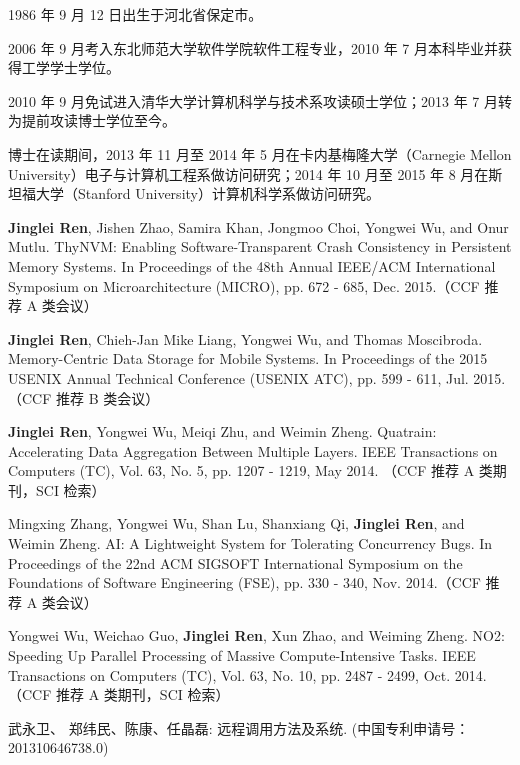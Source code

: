 \begin{resume}


  1986 年 9 月 12 日出生于河北省保定市。

  2006 年 9 月考入东北师范大学软件学院软件工程专业，2010 年 7 月本科毕业并获得工学学士学位。

  2010 年 9 月免试进入清华大学计算机科学与技术系攻读硕士学位；2013 年 7 月转为提前攻读博士学位至今。

  博士在读期间，2013 年 11 月至 2014 年 5 月在卡内基梅隆大学（Carnegie Mellon University）电子与计算机工程系做访问研究；2014 年 10 月至 2015 年 8 月在斯坦福大学（Stanford University）计算机科学系做访问研究。

  \begin{publications}
  \item \textbf{Jinglei Ren}, Jishen Zhao, Samira Khan, Jongmoo Choi, Yongwei Wu, and Onur Mutlu.
ThyNVM: Enabling Software-Transparent Crash Consistency in Persistent Memory Systems.
In Proceedings of the 48th Annual IEEE/ACM International Symposium on Microarchitecture (MICRO), pp. 672 - 685, Dec. 2015.（CCF 推荐 A 类会议）
  \item \textbf{Jinglei Ren}, Chieh-Jan Mike Liang, Yongwei Wu, and Thomas Moscibroda.
Memory-Centric Data Storage for Mobile Systems.
In Proceedings of the 2015 USENIX Annual Technical Conference (USENIX ATC), pp. 599 - 611, Jul. 2015.（CCF 推荐 B 类会议）
  \item \textbf{Jinglei Ren}, Yongwei Wu, Meiqi Zhu, and Weimin Zheng.
Quatrain: Accelerating Data Aggregation Between Multiple Layers.
IEEE Transactions on Computers (TC), Vol. 63, No. 5, pp. 1207 - 1219, May 2014. （CCF 推荐 A 类期刊，SCI 检索）
  \item Mingxing Zhang, Yongwei Wu, Shan Lu, Shanxiang Qi, \textbf{Jinglei Ren}, and Weimin Zheng.
AI: A Lightweight System for Tolerating Concurrency Bugs.
In Proceedings of the 22nd ACM SIGSOFT International Symposium on the Foundations of Software Engineering (FSE), pp. 330 - 340, Nov. 2014.（CCF 推荐 A 类会议）
  \item Yongwei Wu, Weichao Guo, \textbf{Jinglei Ren}, Xun Zhao, and Weiming Zheng.
NO2: Speeding Up Parallel Processing of Massive Compute-Intensive Tasks.
IEEE Transactions on Computers (TC), Vol. 63, No. 10, pp. 2487 - 2499, Oct. 2014.（CCF 推荐 A 类期刊，SCI 检索）
  \end{publications}

  \begin{achievements}
  \item 武永卫、 郑纬民、陈康、任晶磊: 远程调用方法及系统. (中国专利申请号：201310646738.0)
  \end{achievements}
\end{resume}

